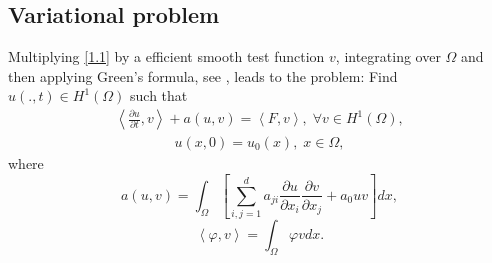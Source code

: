 \documentclass[twocolumn]{article}
\begin{document}
\subsection{Variational problem}
\quad Multiplying \eqref{1.1} by a efficient smooth test function $v$, integrating over $\Omega$ and then applying Green's formula, see \cite{}, leads to the problem: Find $u(.,t)\in H^1(\Omega)$ such that
\begin{align}\label{2.1}
	\left\langle \frac{\partial u}{\partial t}, v \right\rangle+a\left(u, v\right)=\left\langle F, v \right\rangle,\; \forall v\in H^1(\Omega),
\end{align} 
\begin{align}\label{2.2}
	u(x, 0)=u_0(x), \; x\in \Omega,
\end{align}
where 
$$a\left(u, v\right)=\int_{\Omega}\left[\sum_{i, j=1}^{d}a_{ji}\frac{\partial u}{\partial x_i}\frac{\partial v}{\partial x_j}+a_0uv\right]dx,$$
$$\left\langle \varphi, v \right\rangle=\int_{\Omega}\varphi vdx.$$
\end{document}
